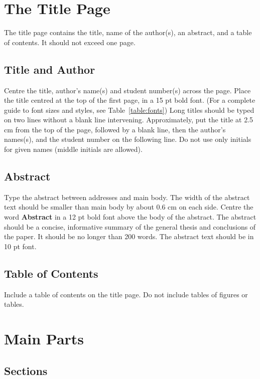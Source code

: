 \documentclass[11pt]{article}
\begin{document}
\section{The Title Page}

The title page contains the title, name of the author(s), an abstract,
and a table of contents. It should not exceed one page.

\subsection{Title and Author}

Centre the title, author's name(s) and student number(s) across
the page.
Place the title centred at the top of the first page, in
a 15 pt bold font. (For a complete guide to font sizes and styles,
see Table~\ref{table:fonts}) Long titles should be typed on two lines
without a blank line intervening. Approximately, put the title at 2.5
cm from the top of the page, followed by a blank line, then the
author's names(s), and the student number on the following line. Do not
use only initials for given names (middle initials are allowed). 


\subsection{Abstract}

 Type the abstract between addresses and main body.
The width of the abstract text should be
smaller than main body by about 0.6 cm on each side.
Centre the word {\bf Abstract} in a 12 pt bold
font above the body of the abstract. The abstract should be a concise, informative
summary of the general thesis and conclusions of the paper. It should
be no longer than 200 words. The abstract text should be in 10 pt font.

\subsection{Table of Contents}

Include a table of contents on the title page. Do not include tables
of figures or tables.


\section{Main Parts}

\subsection{Sections}
\end{document}
